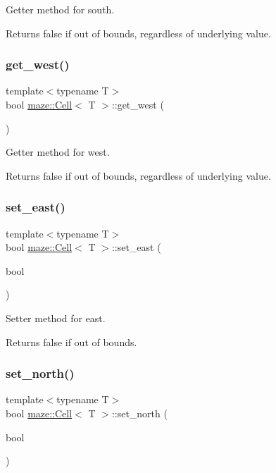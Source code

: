Getter method for south. 

Returns false if out of bounds, regardless of underlying value. \mbox{\label{classmaze_1_1Cell_a40b00cc592c00c60c6749289b8a6c9c9}} 
\subsubsection{\texorpdfstring{get\+\_\+west()}{get\_west()}}
{\footnotesize\ttfamily template$<$typename T$>$ \\
bool \hyperlink{classmaze_1_1Cell}{maze\+::\+Cell}$<$ T $>$\+::get\+\_\+west (\begin{DoxyParamCaption}{ }\end{DoxyParamCaption})}



Getter method for west. 

Returns false if out of bounds, regardless of underlying value. \mbox{\label{classmaze_1_1Cell_a34f010ee5f165f0c253d6bed6c9a99da}} 
\subsubsection{\texorpdfstring{set\+\_\+east()}{set\_east()}}
{\footnotesize\ttfamily template$<$typename T$>$ \\
bool \hyperlink{classmaze_1_1Cell}{maze\+::\+Cell}$<$ T $>$\+::set\+\_\+east (\begin{DoxyParamCaption}\item[{bool}]{ }\end{DoxyParamCaption})}



Setter method for east. 

Returns false if out of bounds. \mbox{\label{classmaze_1_1Cell_a22debec3d758aa08384bdbd1e92cb632}} 
\subsubsection{\texorpdfstring{set\+\_\+north()}{set\_north()}}
{\footnotesize\ttfamily template$<$typename T$>$ \\
bool \hyperlink{classmaze_1_1Cell}{maze\+::\+Cell}$<$ T $>$\+::set\+\_\+north (\begin{DoxyParamCaption}\item[{bool}]{ }\end{DoxyParamCaption})}



